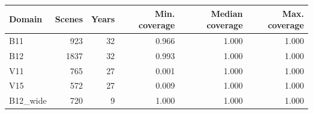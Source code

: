 \begin{tabular}{lrrrrr}\toprule
Domain & Scenes & Years & Min. coverage & Median coverage & Max. coverage\\\midrule
B11 & 923 & 32 & 0.966 & 1.000 & 1.000 \\
B12 & 1837 & 32 & 0.993 & 1.000 & 1.000 \\
V11 & 765 & 27 & 0.001 & 1.000 & 1.000 \\
V15 & 572 & 27 & 0.009 & 1.000 & 1.000 \\
B12\_wide & 720 & 9 & 1.000 & 1.000 & 1.000 \\
\bottomrule\end{tabular}